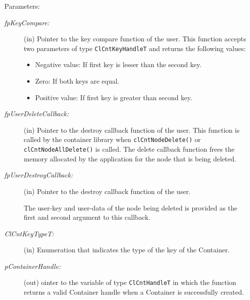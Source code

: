 \begin{Desc}
\item[Parameters:]
\begin{description}
\item[{\em fp\-Key\-Compare:}](in) Pointer to the key compare function of the user. This function accepts two parameters of type {\tt{ClCntKeyHandleT}}
and returns the following values:
\begin{itemize}
\item
Negative value: If first key is lesser than the second key.
\item
Zero: If both keys are equal.
\item
Positive value: If first key is greater than second key. 
\end{itemize}

\item[{\em fp\-User\-Delete\-Callback:}](in) Pointer to the destroy callback function of the user. This function is called by the container library 
when {\tt{clCntNodeDelete()}} or {\tt{clCntNodeAllDelete()}} is called. The delete callback function frees the memory allocated by the application
for the node that is being deleted.

\item[{\em fp\-User\-Destroy\-Callback:}](in) Pointer to the destroy callback function of the user. 

The user-key and user-data of the node being deleted is provided as the first and second argument to this callback.

\item[{\em Cl\-Cnt\-Key\-Type\-T:}](in) Enumeration that indicates the type of the key of the Container.

\item[{\em p\-Container\-Handle:}](out) ointer to the variable of type {\tt{ClCntHandleT}} in which the function returns a valid Container handle when
a Container is successfully created.
\end{description}


\end{Desc}

